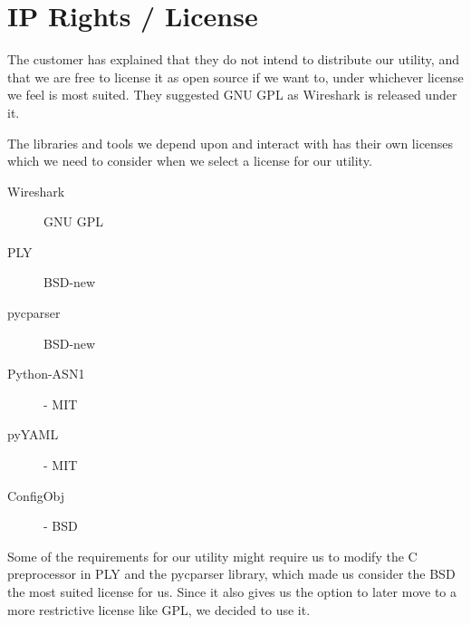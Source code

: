 \section{IP Rights / License}
The customer has explained that they do not intend to distribute our utility,
and that we are free to license it as open source if we want to, under
whichever license we feel is most suited. They suggested GNU GPL as Wireshark
is released under it.

The libraries and tools we depend upon and interact with has their own licenses
which we need to consider when we select a license for our utility.
\begin{description}
	\item[Wireshark] GNU GPL
	\item[PLY] BSD-new
	\item[pycparser] BSD-new
	\item[Python-ASN1] - MIT
	\item[pyYAML] - MIT
	\item[ConfigObj] - BSD
\end{description}

\noindent Some of the requirements for our utility might require us to modify
the C preprocessor in PLY and the pycparser library, which made us consider
the BSD the most suited license for us. Since it also gives us the option to
later move to a more restrictive license like GPL, we decided to use it.

